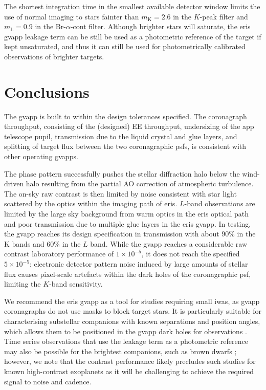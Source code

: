 \documentclass{aa}
\begin{document}
The shortest integration time in the smallest available detector window limits the use of normal imaging to stars fainter than $m_\text{K} = 2.6$ in the $K$-peak filter and $m_\text{L} = 0.9$ in the Br-$\alpha$-cont filter.
%
Although brighter stars will saturate, the \ac{eris} \ac{gvapp} leakage term can be still be used as a photometric reference of the target if kept unsaturated, and thus it can still be used for photometrically calibrated observations of brighter targets.

\section{Conclusions}\label{sec:conclusion}

The \ac{gvapp} is built to within the design tolerances specified.
%
The coronagraph throughput, consisting of the (designed) EE throughput, undersizing of the \ac{app} telescope pupil, transmission due to the liquid crystal and glue layers, and splitting of target flux between the two coronagraphic \acp{psf}, is consistent with other operating \acp{gvapp}.

The phase pattern successfully pushes the stellar diffraction halo below the wind-driven halo resulting from the partial AO correction of atmospheric turbulence.
%
The on-sky raw contrast is then limited by noise consistent with star light scattered by the optics within the imaging path of \ac{eris}.
%
$L$-band observations are limited by the large sky background from warm optics in the \ac{eris} optical path and poor transmission due to multiple glue layers in the \ac{eris} \ac{gvapp}.
%
In testing, the \ac{gvapp} reaches its design specification in transmission with about 90\% in the K bands and 60\% in the $L$ band.
%
While the \ac{gvapp} reaches a considerable raw contrast laboratory performance of $1\times10^{-5}$, it does not reach the specified $5\times10^{-5}$: electronic detector pattern noise induced by large amounts of stellar flux causes pixel-scale artefacts within the dark holes of the coronagraphic \ac{psf}, limiting the $K$-band sensitivity.

We recommend the \ac{eris} \ac{gvapp} as a tool for studies requiring small \acp{iwa}, as \ac{gvapp} coronagraphs do not use masks to block target stars.
%
It is particularly suitable for characterising substellar companions with known separations and position angles, which allows them to be positioned in the \ac{gvapp} dark holes for observations \citep[e.g.][]{2010ApJ...722L..49Q, 2021MNRAS.506.3224S, 2022AJ....163..217D}.
%
Time series observations that use the leakage term as a photometric reference may also be possible for the brightest companions, such as brown dwarfs \citep[e.g.][]{2024MNRAS.531.2168S, 2025MNRAS.544.3191S}; however, we note that the contrast performance likely precludes such studies for known high-contrast exoplanets as it will be challenging to achieve the required signal to noise and cadence.
\end{document}
